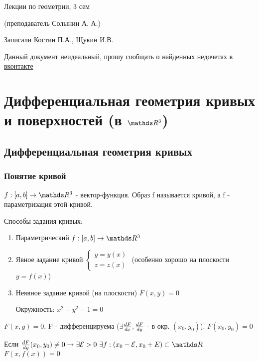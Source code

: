 \documentclass[12pt, fleqn]{article}
\begin{document}
\begin{center}
  \huge Лекции по геометрии, 3 сем
  
  \Large (преподаватель Солынин А. А.)
  
  \large Записали Костин П.А., Щукин И.В.
\end{center}

Данный документ неидеальный, прошу сообщать о найденных недочетах в \href{https://vk.com/drab_existence_a}{вконтакте}
\tableofcontents
\newpage

\section{Дифференциальная геометрия кривых и поверхностей (в $\R^3$)}
\subsection{Дифференциальная геометрия кривых}
\subsubsection{Понятие кривой}

\begin{definition}
    $f:[a,b] \rightarrow \R^3$ - вектор-функция. Образ f называется кривой, а f - параметризация этой кривой.
\end{definition}

Способы задания кривых:
\begin{enumerate}
    \item Параметрический $f:[a,b] \rightarrow \R^3$
    \item Явное задание кривой $\begin{cases} y=y(x)\\ z=z(x)
    \end{cases}$ (особенно хорошо на плоскости $y=f(x)$)
    \item Неявное задание кривой (на плоскости) $F(x,y)=0$
    \begin{example}
        Окружность: $x^2+y^2-1=0$
    \end{example}
\end{enumerate}

\begin{theorem}
$F(x,y)=0$, F - дифференцируема ($\exists \frac{dF}{dx}, \frac{dF}{dy}$ - в окр. $(x_0,y_0)$). $F(x_0,y_0)=0$

Если $\frac{dF}{dy}(x_0,y_0) \neq 0 \ra \e \E>0\ \e f: (x_0-\E,x_0+E) \subset \R$ $F(x, f(x))=0$
\end{theorem}
\end{document}
